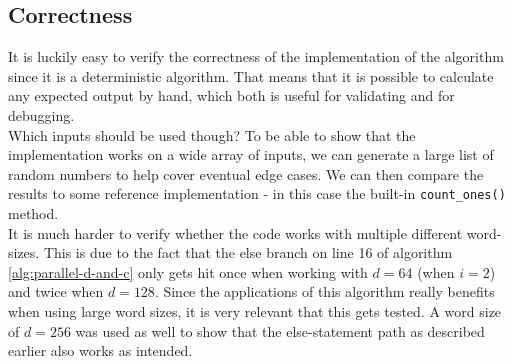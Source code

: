 \subsection{Correctness}
It is luckily easy to verify the correctness of the implementation of the algorithm since it is a deterministic algorithm. That means that it is possible to calculate any expected output by hand, which both is useful for validating and for debugging.\\
Which inputs should be used though? To be able to show that the implementation works on a wide array of inputs, we can generate a large list of random numbers to help cover eventual edge cases. We can then compare the results to some reference implementation - in this case the built-in \texttt{count\_ones()} method.\\
It is much harder to verify whether the code works with multiple different word-sizes. This is due to the fact that the else branch on line 16 of algorithm \ref{alg:parallel-d-and-c} only gets hit once when working with $d=64$ (when $i=2$) and twice when $d=128$. Since the applications of this algorithm really benefits when using large word sizes, it is very relevant that this gets tested. A word size of $d=256$ was used as well to show that the else-statement path as described earlier also works as intended.
